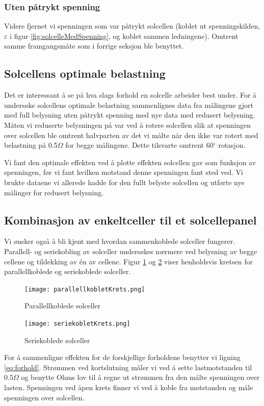 \documentclass[a4paper,11pt, twocolumn]{article}
\begin{document}
\subsubsection{Uten påtrykt spenning}
Videre fjernet vi spenningen som var påtrykt solcellen (koblet ut spenningskilden, $\varepsilon$ i figur \ref{fig:solcelleMedSpenning}, og koblet sammen ledningene). Omtrent samme framgangsmåte som i forrige seksjon ble benyttet.
\subsection{Solcellens optimale belastning}
Det er interessant å se på hva slags forhold en solcelle arbeider best under.
For å undersøke solcellens optimale belastning sammenlignes data fra målingene gjort med full belysning uten påtrykt spenning med nye data med redusert belysning. Måten vi reduserte belysningen på var ved å rotere solcellen slik at spenningen over solcellen ble omtrent halvparten av det vi målte når den ikke var rotert med belastning på 0.5$\Omega$ for begge målingene. Dette tilsvarte omtrent 60$^\circ$ rotasjon.

Vi fant den optimale effekten ved å plotte effekten solcellen gav som funksjon av spenningen, før vi fant hvilken motstand denne spenningen fant sted ved. Vi brukte dataene vi allerede hadde for den fullt belyste solcellen og utførte nye målinger for redusert belysning.
\subsection{Kombinasjon av enkeltceller til et solcellepanel}
Vi ønsker også å bli kjent med hvordan sammenkoblede solceller fungerer. Parallell- og seriekobling av solceller undersøkes nærmere ved belysning av begge cellene og tildekking av \'en av cellene. Figur \ref{fig:parallell} og \ref{fig:serie} viser henholdsvis kretsen for parallellkoblede og seriekoblede solceller.
\begin{figure}[!ht]
	\texttt{[image: parallellkobletKrets.png]}
	\caption{Parallellkoblede solceller}
	\label{fig:parallell}
\end{figure}

\begin{figure}[!ht]
	\texttt{[image: seriekobletKrets.png]}
	\caption{Seriekoblede solceller}
	\label{fig:serie}
\end{figure}

For å sammenligne effekten for de forskjellige forholdene benytter vi ligning \eqref{eq:forhold}. Strømmen ved kortslutning måler vi ved å sette lastmotstanden til $0.5\Omega$ og benytte Ohms lov til å regne ut strømmen fra den målte spenningen over lasten. Spenningen ved åpen krets finner vi ved å koble fra motstanden og måle spenningen over solcellen.
\end{document}
